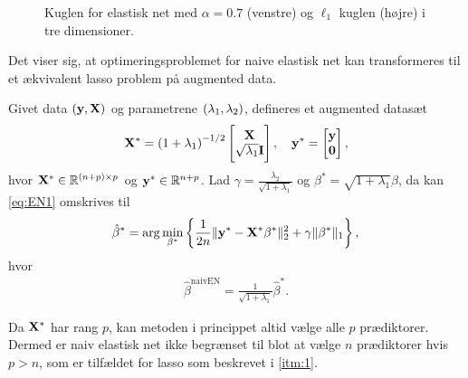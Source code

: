 %
\begin{figure}[H]
\centering
\caption{Kuglen for elastisk net med \(\alpha=0.7\) (venstre) og \(\ell_1\) kuglen (højre) i tre dimensioner.}
\label{fig:elastisk_net}
\end{figure}
%
Det viser sig, at optimeringsproblemet for naive elastisk net kan transformeres til et ækvivalent lasso problem på augmented data.
%
\begin{lem} \label{lem:elastisk_net}
Givet data \(\del{\y, \X}\) og parametrene \(\del{\lambda_1, \lambda_2}\), defineres et augmented datasæt 
\begin{align*}
\X^* = \del{1 + \lambda_1}^{-1/2} \begin{bmatrix}
\X \\ \sqrt{\lambda_1} \mathbf{I}
\end{bmatrix}, \quad \y^* = \begin{bmatrix}
\y \\ \mathbf{0}
\end{bmatrix},
\end{align*}
hvor \(\X^* \in \mathbb{R}^{\del{n+p} \times p}\) og \(\mathbf{y}^* \in \mathbb{R}^{n+p}\).
Lad \(\gamma = \frac{\lambda_2}{\sqrt{1+\lambda_1}}\) og \(\beta^* = \sqrt{1+\lambda_1} \beta\), da kan \eqref{eq:EN1} omskrives til
\begin{align*}
\hat{\beta}^* = \arg \min_{\beta^*} \cbr{\frac{1}{2n} \Vert \y^* - \X^* \beta^* \Vert_2^2 +\gamma \Vert \beta^* \Vert_1},
\end{align*}
hvor
\begin{align*}
\hat{\beta}^\text{naivEN} = \frac{1}{\sqrt{1+\lambda_1}} \hat{\beta}^*.
\end{align*}
\end{lem}
%
Da \(\mathbf{X}^*\) har rang \(p\), kan metoden i princippet altid vælge alle \(p\) prædiktorer.
Dermed er naiv elastisk net ikke begrænset til blot at vælge \(n\) prædiktorer hvis \(p > n\), som er tilfældet for lasso som beskrevet i \ref{itm:1}.
